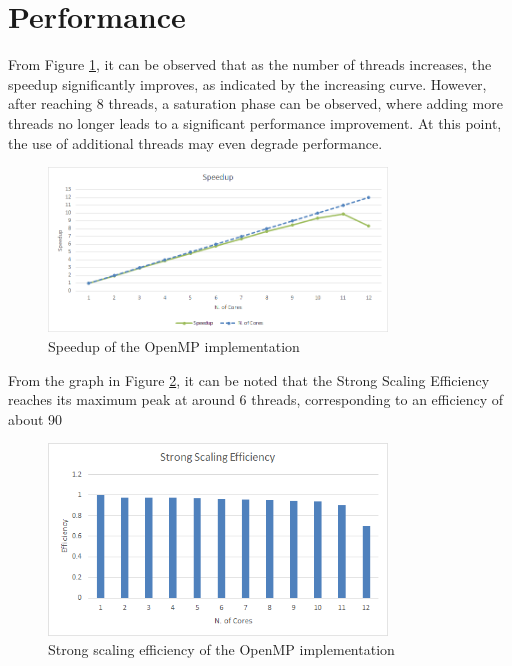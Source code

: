 \documentclass[a4paper, 12pt]{report}
\begin{document}
\section*{Performance}
\begin{sloppypar}
  \noindent
  From Figure \ref{fig:omp_speedup}, it can be observed that as the number of threads increases, the speedup significantly improves, as indicated by the increasing curve. However, after reaching 8 threads, a saturation phase can be observed, where adding more threads no longer leads to a significant performance improvement. At this point, the use of additional threads may even degrade performance.

  \begin{figure}[ht]
    \centering
    \includegraphics[width=9cm]{img/omp-speedup.png}
    \caption{Speedup of the OpenMP implementation}
    \label{fig:omp_speedup}
  \end{figure}

  \noindent
  From the graph in Figure \ref{fig:omp_sse}, it can be noted that the Strong Scaling Efficiency reaches its maximum peak at around 6 threads, corresponding to an efficiency of about 90%

  \begin{figure}[ht]
    \centering
    \includegraphics[width=9cm]{img/omp-sse.png}
    \caption{Strong scaling efficiency of the OpenMP implementation}
    \label{fig:omp_sse}
  \end{figure}


\end{sloppypar}
\end{document}
